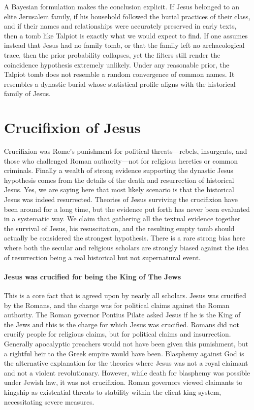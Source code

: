 A Bayesian formulation makes the conclusion explicit.
If Jesus belonged to an elite Jerusalem family, if his household followed the burial practices of their class, and if their names and relationships were accurately preserved in early texts, then a tomb like Talpiot is exactly what we would expect to find.
If one assumes instead that Jesus had no family tomb, or that the family left no archaeological trace, then the prior probability collapses, yet the filters still render the coincidence hypothesis extremely unlikely.
Under any reasonable prior, the Talpiot tomb does not resemble a random convergence of common names.
It resembles a dynastic burial whose statistical profile aligns with the historical family of Jesus.


\section{Crucifixion of Jesus}\label{sec:crucifixion-of-jesus}
Crucifixion was Rome's punishment for political threats---rebels, insurgents, and those who challenged Roman authority---not for religious heretics or common criminals.
Finally a wealth of strong evidence supporting the dynastic Jesus hypothesis comes from the details of the death and resurrection of historical Jesus.
Yes, we are saying here that most likely scenario is that the historical Jesus was indeed resurrected.
Theories of Jesus surviving the crucifixion have been around for a long time, but the evidence put forth has never been evaluated in a systematic way.
We claim that gathering all the textual evidence together the survival of Jesus, his resuscitation, and the resulting empty tomb should actually be considered the strongest hypothesis.
There is a rare strong bias here where both the secular and religious scholars are strongly biased against the idea of resurrection being a real historical but not supernatural event.

\paragraph{Jesus was crucified for being the King of The Jews}\label{par:jesus-was-crucified-for-being-the-king-of-the-jews}
This is a core fact that is agreed upon by nearly all scholars.
Jesus was crucified by the Romans, and the charge was for political claims against the Roman authority.
The Roman governor Pontius Pilate asked Jesus if he is the King of the Jews and this is the charge for which Jesus was crucified.
Romans did not crucify people for religious claims, but for political claims and insurrection.
Generally apocalyptic preachers would not have been given this punishment, but a rightful heir to the Greek empire would have been.
Blasphemy against God is the alternative explanation for the theories where Jesus was not a royal claimant and not a violent revolutionary.
However, while death for blasphemy was possible under Jewish law, it was not crucifixion.
Roman governors viewed claimants to kingship as existential threats to stability within the client-king system, necessitating severe measures.
